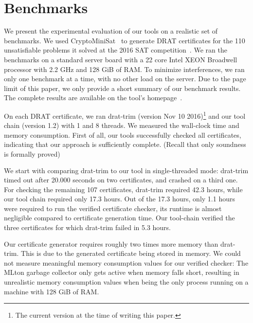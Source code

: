 \documentclass[smallcondensed]{svjour3}     %
\begin{document}
\section{Benchmarks}\label{sec:benchmarks}
We present the experimental evaluation of our tools on a realistic set of benchmarks.
We used CryptoMiniSat~\cite{SNC09,SATCOMP16} to generate DRAT certificates for the 110 unsatisfiable problems it solved at the 2016 SAT competition~\cite{satcomp-2016}.
We ran the benchmarks on a standard server board with a 22 core Intel XEON Broadwell processor with 2.2 GHz and 128 GiB of RAM.
To minimize interferences, we ran only one benchmark at a time, with no other load on the server. 
Due to the page limit of this paper, we only provide a short summary of our benchmark results. The complete results are available on the tool's homepage~\cite{GRAT-homepage}.

On each DRAT certificate, we ran drat-trim (version Nov 10 2016)\footnote{The current version at the time of writing this paper.}
and our tool chain (version 1.2) with 1 and 8 threads.
We measured the wall-clock time and memory consumption. First of all, our tools successfully checked all certificates, 
indicating that our approach is sufficiently complete. (Recall that only soundness is formally proved)

We start with comparing drat-trim to our tool in single-threaded mode: drat-trim timed out after 20.000 seconds on two certificates, and crashed on a third one.
For checking the remaining 107 certificates, drat-trim required 42.3 hours, while our tool chain required only 17.3 hours.
Out of the 17.3 hours, only 1.1 hours were required to run the verified certificate checker, \ie its runtime is almost negligible compared to certificate generation time.
Our tool-chain verified the three certificates for which drat-trim failed in 5.3 hours.

Our certificate generator requires roughly two times more memory than drat-trim. This is due to the generated certificate being stored 
in memory. We could not measure meaningful memory consumption values for our verified checker: The MLton garbage collector only gets active when memory falls short, 
resulting in unrealistic memory consumption values when being the only process running on a machine with 128 GiB of RAM.
\end{document}
